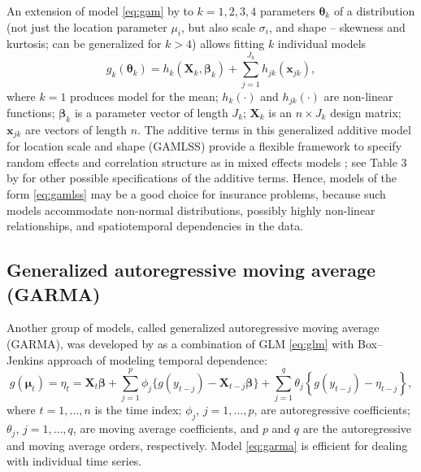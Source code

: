 \documentclass[
]{book}
\begin{document}
An extension of model \eqref{eq:gam} by \citet{Stasinopoulos:Rigby:2007} to \(k=1,2,3,4\) parameters \(\boldsymbol{\theta}_k\) of a distribution (not just the location parameter \(\mu_i\), but also scale \(\sigma_i\), and shape -- skewness and kurtosis; can be generalized for \(k>4\)) allows fitting \(k\) individual models
\begin{equation}
   \label{eq:gamlss}
    g_k(\boldsymbol{\theta}_k) = h_k\left(\mathbf{X}_k,\boldsymbol{\beta}_k\right) + \sum_{j=1}^{J_k}h_{jk}(\mathbf{x}_{jk}),
\end{equation}
where \(k=1\) produces model for the mean; \(h_k(\cdot)\) and \(h_{jk}(\cdot)\) are non-linear functions; \(\boldsymbol{\beta}_k\) is a parameter vector of length \(J_k\); \(\mathbf{X}_k\) is an \(n\times J_k\) design matrix; \(\mathbf{x}_{jk}\) are vectors of length \(n\). The additive terms in this generalized additive model for location scale and shape (GAMLSS) provide a flexible framework to specify random effects and correlation structure as in mixed effects models \citep{Zuur:etal:2009}; see Table 3 by \citet{Stasinopoulos:Rigby:2007} for other possible specifications of the additive terms. Hence, models of the form \eqref{eq:gamlss} may be a good choice for insurance problems, because such models accommodate non-normal distributions, possibly highly non-linear relationships, and spatiotemporal dependencies in the data.

\hypertarget{generalized-autoregressive-moving-average-garma}{%
\subsection{Generalized autoregressive moving average (GARMA)}\label{generalized-autoregressive-moving-average-garma}}

Another group of models, called generalized autoregressive moving average (GARMA), was developed by \citet{Benjamin:etal:2003} as a combination of GLM \eqref{eq:glm} with Box--Jenkins approach of modeling temporal dependence:
\begin{equation}
    \label{eq:garma}
    g(\boldsymbol{\mu}_t) = \eta_t = \mathbf{X}_t\boldsymbol{\beta} + \sum_{j=1}^p{\phi_j \{ g(y_{t-j}) - \mathbf{X}_{t-j}\boldsymbol{\beta}\}} + \sum_{j=1}^q \theta_j \left\{ g(y_{t-j}) - \eta_{t-j}\right\},
\end{equation}
where \(t=1,\ldots,n\) is the time index; \(\phi_j\), \(j=1,\ldots,p\), are autoregressive coefficients; \(\theta_j\), \(j=1,\ldots,q\), are moving average coefficients, and \(p\) and \(q\) are the autoregressive and moving average orders, respectively. Model \eqref{eq:garma} is efficient for dealing with individual time series.
\end{document}
